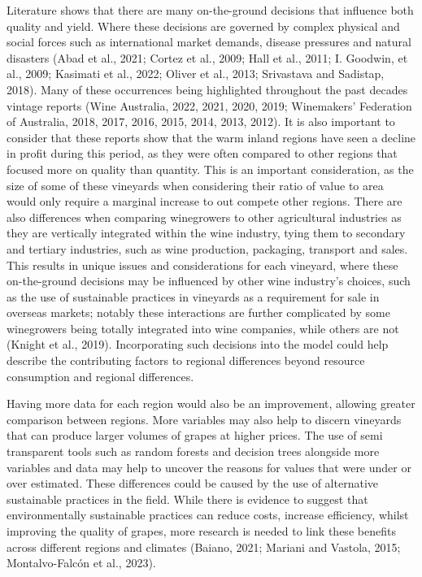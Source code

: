 \documentclass[
  journal=large,
  manuscript=article-type,
  year=2023,
  volume=?,
]{cup-journal}
\begin{document}
Literature shows that there are many on-the-ground decisions that influence both quality and yield. Where these decisions are governed by complex physical and social forces such as international market demands, disease pressures and natural disasters (Abad et al., 2021; Cortez et al., 2009; Hall et al., 2011; I. Goodwin, et al., 2009; Kasimati et al., 2022; Oliver et al., 2013; Srivastava and Sadistap, 2018). Many of these occurrences being highlighted throughout the past decades vintage reports (Wine Australia, 2022, 2021, 2020, 2019; Winemakers’ Federation of Australia, 2018, 2017, 2016, 2015, 2014, 2013, 2012). It is also important to consider that these reports show that the warm inland regions have seen a decline in profit during this period, as they were often compared to other regions that focused more on quality than quantity. This is an important consideration, as the size of some of these vineyards when considering their ratio of value to area would only require a marginal increase to out compete other regions. There are also differences when comparing winegrowers to other agricultural industries as they are vertically integrated within the wine industry, tying them to secondary and tertiary industries, such as wine production, packaging, transport and sales. This results in unique issues and considerations for each vineyard, where these on-the-ground decisions may be influenced by other wine industry’s choices, such as the use of sustainable practices in vineyards as a requirement for sale in overseas markets; notably these interactions are further complicated by some winegrowers being totally integrated into wine companies, while others are not (Knight et al., 2019). Incorporating such decisions into the model could help describe the contributing factors to regional differences beyond resource consumption and regional differences. 

Having more data for each region would also be an improvement, allowing greater comparison between regions. More variables may also help to discern vineyards that can produce larger volumes of grapes at higher prices. The use of semi transparent tools such as random forests and decision trees alongside more variables and data may help to uncover the reasons for values that were under or over estimated. These differences could be caused by the use of alternative sustainable practices in the field. While there is evidence to suggest that environmentally sustainable practices can reduce costs, increase efficiency, whilst improving the quality of grapes, more research is needed to link these benefits across different regions and climates (Baiano, 2021; Mariani and Vastola, 2015; Montalvo-Falcón et al., 2023).
\end{document}
